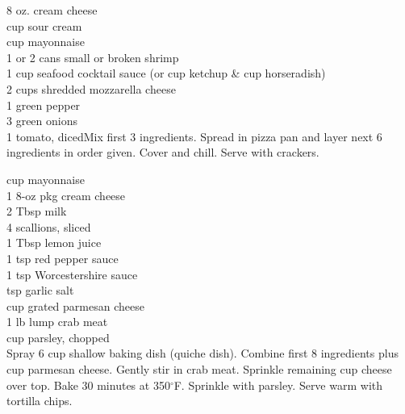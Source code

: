 \begin{minipage}{\linewidth}
\end{minipage}\par\begin{minipage}{\linewidth}  
	\step
	{8 oz. cream cheese	\\
	  cup sour cream\\
	  cup mayonnaise	\\
	 1 or 2 cans small or broken shrimp\\
	 1 cup seafood cocktail sauce (or  cup ketchup \&  cup horseradish) \\
	 2 cups shredded mozzarella cheese	\\
	 1 green pepper\\
	 3 green onions	\\
	 1 tomato, diced}{Mix first 3 ingredients. Spread in pizza pan and layer next 6 ingredients in order given. Cover and chill. Serve with crackers.}

\end{minipage}\par\begin{minipage}{\linewidth}  
	\step
	{ cup mayonnaise	\\
	 1 8-oz pkg cream cheese\\
	 2 Tbsp milk	\\
	 4 scallions, sliced\\
	 1 Tbsp lemon juice	\\
	 1 tsp red pepper sauce\\
	 1 tsp Worcestershire sauce	\\
	  tsp garlic salt\\
	  cup grated parmesan cheese	\\
	 1 lb lump crab meat\\
	  cup parsley, chopped\\
		}{
Spray 6 cup shallow baking dish (quiche dish). Combine first 8 ingredients plus  cup parmesan cheese. Gently stir in crab meat. Sprinkle remaining  cup cheese over top. Bake 30 minutes at 350${}^\circ$F. Sprinkle with parsley. Serve warm with tortilla chips.}


\end{minipage}
